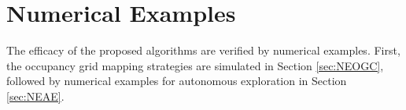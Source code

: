 \documentclass[smallextended]{svjour3}       %
\newcommand{\braces}[1]{\ensuremath{\left\{ #1 \right\}}}
\newcommand{\argmin}{\operatornamewithlimits{argmin}}
\newcommand{\argmax}{\operatornamewithlimits{argmax}}
\begin{document}
%
%










\section{Numerical Examples}
\label{sec:NumRes}

The efficacy of the proposed algorithms are verified by numerical examples. First, the occupancy grid mapping strategies are simulated in Section \ref{sec:NEOGC}, followed by numerical examples for autonomous exploration in Section \ref{sec:NEAE}. 
\end{document}
